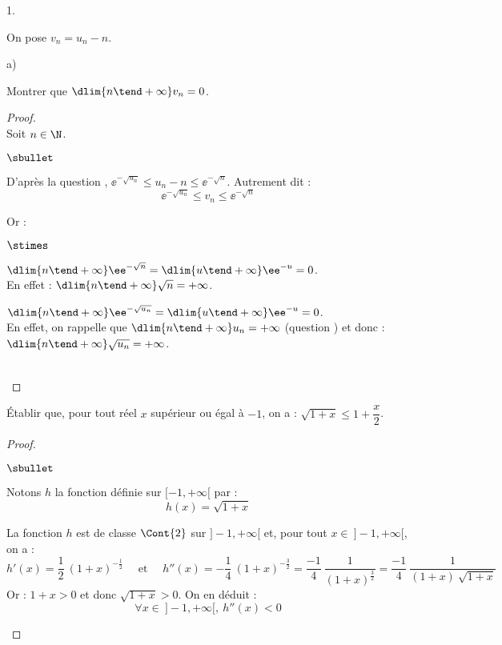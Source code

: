 \documentclass[11pt]{article}%
\begin{document}
\begin{noliste}{1.}


\item On pose $v_n = u_n-n$.
  \begin{noliste}{a)}
    \setlength{\itemsep}{2mm}
  \item Montrer que $\dlim{n \tend +\infty} v_n= 0$.

    \begin{proof}~\\
      Soit $n\in\N$.
      \begin{noliste}{$\sbullet$}
      \item D'après la question , $\ee^{-\sqrt{u_n}} \leq
        u_n -n \leq \ee^{-\sqrt{n}}$. Autrement dit :
        \[
        \ee^{-\sqrt{u_n}} \leq v_n \leq \ee^{-\sqrt{n}}
        \]

      \item Or :
       \begin{noliste}{$\stimes$}
       \item $\dlim{n \tend +\infty} \ee^{-\sqrt{n}} = \dlim{u \tend
           +\infty} \ee^{-u} = 0$.\\[.1cm]
         En effet : $\dlim{n \tend +\infty} \sqrt{n} = +\infty$. 
       \item $\dlim{n \tend +\infty} \ee^{-\sqrt{u_n}} = \dlim{u \tend
           +\infty} \ee^{-u} = 0$.\\[.1cm]
         En effet, on rappelle que $\dlim{n \tend +\infty} u_n =
         +\infty$ (question ) et donc : $\dlim{n \tend
           +\infty} \sqrt{u_n} = +\infty$.
       \end{noliste}
     \end{noliste}
     ~\\[-1.2cm]
    \end{proof}

  \item Établir que, pour tout réel $x$ supérieur ou égal à $-1$, on a
    : $\sqrt{1 + x} \leq 1 + \dfrac{x}{2}$.

    \begin{proof}~%
      \begin{noliste}{$\sbullet$}
      \item Notons $h$ la fonction définie sur $[-1,+\infty[$ par :
        \[
        h(x) = \sqrt{1+x}
        \]

      \item La fonction $h$ est de classe $\Cont{2}$ sur
        $]-1,+\infty[$ et, pour tout $x\in \ ]-1,+\infty[$, on a :
        \[
        h'(x) = \dfrac{1}{2} \ (1+x)^{-\frac{1}{2}}
        \quad \text{ et } \quad h''(x) = -\dfrac{1}{4} \
        (1+x)^{-\frac{3}{2}} = \dfrac{-1}{4} \
        \dfrac{1}{(1+x)^{\frac{3}{2}}} = \dfrac{-1}{4} \
        \dfrac{1}{(1+x) \ \sqrt{1+x}}
        \]
        Or : $1+x > 0$ et donc $\sqrt{1+x} > 0$. On en déduit :
        \[
        \forall x \in \ ]-1,+\infty[, \ h''(x)<0
        \]


\end{noliste}
\end{proof}
\end{noliste}
\end{noliste}
\end{document}
